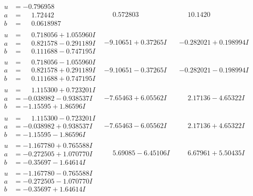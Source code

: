 \documentclass[1p]{elsarticle_modified}
\theoremstyle{definition}
\begin{document}
$$\begin{array}{c|c|c}
\begin{aligned}
u &= -0.796958\phantom{ +0.000000I} \\
a &= \phantom{-}1.72442\phantom{ +0.000000I} \\
b &= \phantom{-}0.0618987\phantom{ +0.000000I}\end{aligned}
 & \phantom{-}0.572803\phantom{ +0.000000I} & \phantom{-}10.1420\phantom{ +0.000000I} \\ \hline\begin{aligned}
u &= \phantom{-}0.718056 + 1.055960 I \\
a &= \phantom{-}0.821578 - 0.291189 I \\
b &= \phantom{-}0.111688 - 0.747195 I\end{aligned}
 & -9.10651 + 0.37265 I & -0.282021 + 0.198994 I \\ \hline\begin{aligned}
u &= \phantom{-}0.718056 - 1.055960 I \\
a &= \phantom{-}0.821578 + 0.291189 I \\
b &= \phantom{-}0.111688 + 0.747195 I\end{aligned}
 & -9.10651 - 0.37265 I & -0.282021 - 0.198994 I \\ \hline\begin{aligned}
u &= \phantom{-}1.115300 + 0.723201 I \\
a &= -0.038982 - 0.938537 I \\
b &= -1.15595 + 1.86596 I\end{aligned}
 & -7.65463 + 6.05562 I & \phantom{-}2.17136 - 4.65322 I \\ \hline\begin{aligned}
u &= \phantom{-}1.115300 - 0.723201 I \\
a &= -0.038982 + 0.938537 I \\
b &= -1.15595 - 1.86596 I\end{aligned}
 & -7.65463 - 6.05562 I & \phantom{-}2.17136 + 4.65322 I \\ \hline\begin{aligned}
u &= -1.167780 + 0.765588 I \\
a &= -0.272505 + 1.070770 I \\
b &= -0.35697 - 1.64614 I\end{aligned}
 & \phantom{-}5.69085 - 6.45106 I & \phantom{-}6.67961 + 5.50435 I \\ \hline\begin{aligned}
u &= -1.167780 - 0.765588 I \\
a &= -0.272505 - 1.070770 I \\
b &= -0.35697 + 1.64614 I\end{aligned}

\end{array}$$
\end{document}
